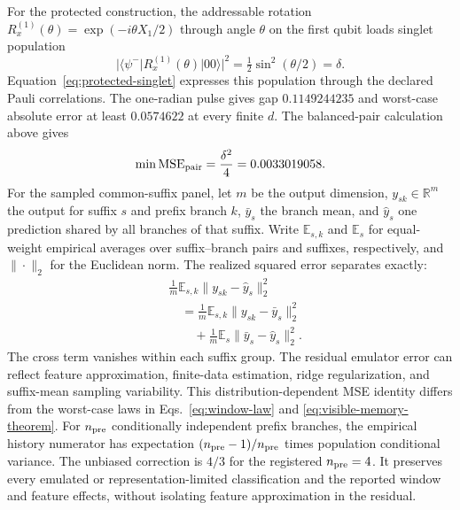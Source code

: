 For the protected construction, the addressable rotation
$R_x^{(1)}(\theta)=\exp(-i\theta X_1/2)$ through angle $\theta$ on the first
qubit loads singlet population
\begin{equation}
 |\langle\psi^-|R_x^{(1)}(\theta)|00\rangle|^2
 =\tfrac12\sin^2(\theta/2)=\delta.
\end{equation}
Equation~\eqref{eq:protected-singlet} expresses this population through the
declared Pauli correlations. The one-radian pulse gives gap $0.1149244235$
and worst-case absolute error at least $0.0574622$ at every finite $d$.
The balanced-pair calculation above gives
\begin{equation}
 \min\operatorname{MSE}_{\rm pair}
 =\frac{\delta^2}{4}=0.0033019058 .
 \label{eq:protected-pair-mse}
\end{equation}
For the sampled common-suffix panel, let $m$ be the output dimension,
$y_{sk}\in\mathbb R^m$ the output for suffix $s$ and prefix branch $k$,
$\bar y_s$ the branch mean, and $\widehat y_s$ one prediction shared by all
branches of that suffix. Write $\mathbb E_{s,k}$ and $\mathbb E_s$ for
equal-weight empirical averages over suffix--branch pairs and suffixes,
respectively, and $\|\cdot\|_2$ for the Euclidean norm.
The realized squared error separates exactly:
\begin{equation}
 \begin{aligned}
 &\frac1m\mathbb E_{s,k}\|y_{sk}-\widehat y_s\|_2^2\\
 &\quad=\frac1m\mathbb E_{s,k}\|y_{sk}-\bar y_s\|_2^2\\
 &\qquad+\frac1m\mathbb E_s\|\bar y_s-\widehat y_s\|_2^2 .
 \end{aligned}
 \label{eq:panel-decomposition}
\end{equation}
The cross term vanishes within each suffix group. The residual emulator error can reflect
feature approximation, finite-data estimation, ridge regularization, and
suffix-mean sampling variability. This distribution-dependent MSE identity
differs from the worst-case laws in
Eqs.~\eqref{eq:window-law} and \eqref{eq:visible-memory-theorem}.
For $n_{\rm pre}$ conditionally independent prefix branches, the empirical
history numerator has expectation $(n_{\rm pre}-1)/n_{\rm pre}$ times
population conditional variance. The unbiased correction is $4/3$ for
the registered $n_{\rm pre}=4$. It preserves every emulated or
representation-limited classification and the reported window and feature
effects, without isolating feature approximation in the residual.

